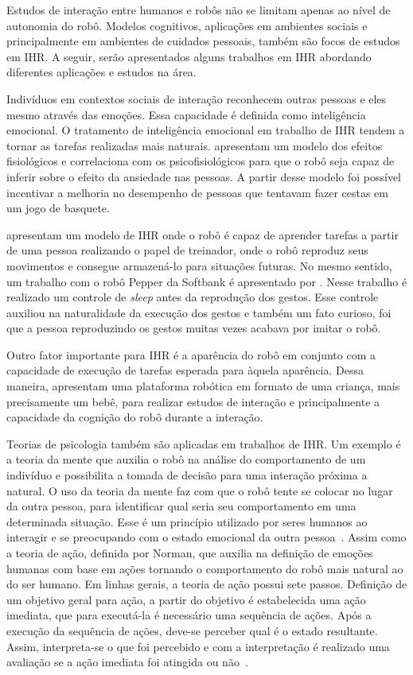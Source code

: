 Estudos de interação entre humanos e robôs não se limitam apenas ao nível de autonomia do robô. Modelos cognitivos, aplicações em ambientes sociais e principalmente em ambientes de cuidados pessoais, também são focos de estudos em IHR. A seguir, serão apresentados alguns trabalhos em IHR abordando diferentes aplicações e estudos na área.

Indivíduos em contextos sociais de interação reconhecem outras pessoas e eles mesmo através das emoções. Essa capacidade é definida como inteligência emocional. O tratamento de inteligência emocional em trabalho de IHR tendem a tornar as tarefas realizadas mais naturais. \textcite{rani:2006} apresentam um modelo dos efeitos fisiológicos e correlaciona com os psicofisiológicos para que o robô seja capaz de inferir sobre o efeito da ansiedade nas pessoas. A partir desse modelo foi possível incentivar a melhoria no desempenho de pessoas que tentavam fazer cestas em um jogo de basquete.

\textcite{giovannangeli:2007} apresentam um modelo de IHR onde o robô é capaz de aprender tarefas a partir de uma pessoa realizando o papel de treinador, onde o robô reproduz seus movimentos e consegue armazená-lo para situações futuras. No mesmo sentido, um trabalho com o robô Pepper da Softbank é apresentado por \textcite{kitagawa:2016}. Nesse trabalho é realizado um controle de \emph{sleep} antes da reprodução dos gestos. Esse controle auxiliou na naturalidade da execução dos gestos e também um fato curioso, foi que a pessoa reproduzindo os gestos muitas vezes acabava por imitar o robô.

Outro fator importante para IHR é a aparência do robô em conjunto com a capacidade de execução de tarefas esperada para àquela aparência. Dessa maneira, \textcite{minato:2007} apresentam uma plataforma robótica em formato de uma criança, mais precisamente um bebê, para realizar estudos de interação e principalmente a capacidade da cognição do robô durante a interação.

Teorias de psicologia também são aplicadas em trabalhos de IHR. Um exemplo é a teoria da mente que auxilia o robô na análise do comportamento de um indivíduo e possibilita a tomada de decisão para uma interação próxima a natural. O uso da teoria da mente faz com que o robô tente se colocar no lugar da outra pessoa, para identificar qual seria seu comportamento em uma determinada situação. Esse é um princípio utilizado por seres humanos ao interagir e se preocupando com o estado emocional da outra pessoa~\cite{hiatt:2011}. Assim como a teoria de ação, definida por Norman, que auxilia na definição de emoções humanas com base em ações tornando o comportamento do robô mais natural ao do ser humano. Em linhas gerais, a teoria de ação possui sete passos. Definição de um objetivo geral para ação, a partir do objetivo é estabelecida uma ação imediata, que para executá-la é necessário uma sequência de ações. Após a execução da sequência de ações, deve-se perceber qual é o estado resultante. Assim, interpreta-se o que foi percebido e com a interpretação é realizado uma avaliação se a ação imediata foi atingida ou não~\cite{toumi:2013}.

